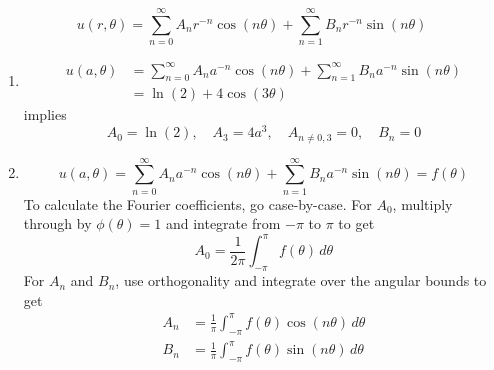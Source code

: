\documentclass[a4paper]{article}
\begin{document}
\[
	u \!\left( r,\theta \right) = \sum^{\infty}_{n=0} A_{n}r^{-n}\cos\!\left(n \theta\right) + \sum^{\infty}_{n=1} B_{n}r^{-n}\sin\!\left(n \theta\right)
\]
\begin{enumerate}[label=(\alph*)]
	\item 
	\begin{align*}
		u \!\left( a,\theta \right) & = \sum^{\infty}_{n=0} A_{n}a^{-n}\cos\!\left(n \theta\right) + \sum^{\infty}_{n=1} B_{n}a^{-n}\sin\!\left(n \theta\right) \\
					    & = \ln\!\left(2\right) + 4 \cos\!\left(3 \theta\right)
	\end{align*}
	implies 
	\[
		A_{0} = \ln\!\left(2\right), \quad A_{3} = 4a^{3}, \quad A_{n \neq 0,3} = 0, \quad B_{n} = 0
	\]
	\item 
	\[
		u \!\left( a,\theta \right) = \sum^{\infty}_{n=0} A_{n}a^{-n}\cos\!\left(n \theta\right) + \sum^{\infty}_{n=1} B_{n}a^{-n}\sin\!\left(n \theta\right) = f \!\left( \theta \right) 
	\]
	To calculate the Fourier coefficients, go case-by-case. For \( A_{0} \), multiply through by \( \phi \!\left( \theta \right) = 1 \) and integrate from \( -\pi \) to \( \pi \) to get
	\[
		A_{0} = \frac{1}{2 \pi}\int^{\pi}_{-\pi} f \!\left( \theta \right) \, d \theta
	\]
	For \( A_{n} \) and \( B_{n} \), use orthogonality and integrate over the angular bounds to get
	\begin{align*}
		A_{n} & = \frac{1}{\pi}\int^{\pi}_{-\pi} f \!\left( \theta \right)\cos\!\left(n \theta\right) \, d \theta \\
		B_{n} & = \frac{1}{\pi}\int^{\pi}_{-\pi} f \!\left( \theta \right)\sin\!\left(n \theta\right) \, d \theta
	\end{align*}
\end{enumerate}

\end{document}
